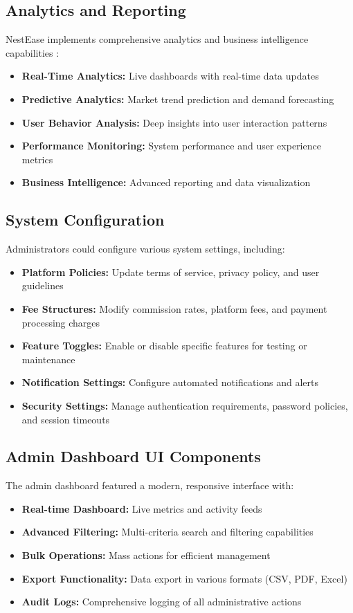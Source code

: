 \documentclass[conference]{IEEEtran}
\begin{document}
\subsection{Analytics and Reporting}
NestEase implements comprehensive analytics and business intelligence capabilities \cite{data_analytics}:

\begin{itemize}
    \item \textbf{Real-Time Analytics:} Live dashboards with real-time data updates
    \item \textbf{Predictive Analytics:} Market trend prediction and demand forecasting
    \item \textbf{User Behavior Analysis:} Deep insights into user interaction patterns
    \item \textbf{Performance Monitoring:} System performance and user experience metrics
    \item \textbf{Business Intelligence:} Advanced reporting and data visualization
\end{itemize}

\subsection{System Configuration}
Administrators could configure various system settings, including:

\begin{itemize}
    \item \textbf{Platform Policies:} Update terms of service, privacy policy, and user guidelines
    \item \textbf{Fee Structures:} Modify commission rates, platform fees, and payment processing charges
    \item \textbf{Feature Toggles:} Enable or disable specific features for testing or maintenance
    \item \textbf{Notification Settings:} Configure automated notifications and alerts
    \item \textbf{Security Settings:} Manage authentication requirements, password policies, and session timeouts
\end{itemize}

\subsection{Admin Dashboard UI Components}
The admin dashboard featured a modern, responsive interface with:

\begin{itemize}
    \item \textbf{Real-time Dashboard:} Live metrics and activity feeds
    \item \textbf{Advanced Filtering:} Multi-criteria search and filtering capabilities
    \item \textbf{Bulk Operations:} Mass actions for efficient management
    \item \textbf{Export Functionality:} Data export in various formats (CSV, PDF, Excel)
    \item \textbf{Audit Logs:} Comprehensive logging of all administrative actions
\end{itemize}
\end{document}
